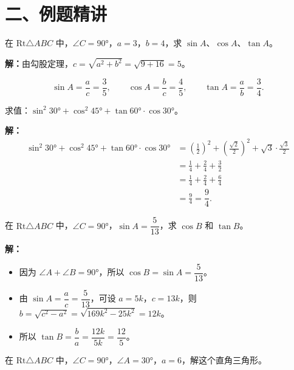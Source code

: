 \documentclass[12pt, a4paper]{ctexart}
\begin{document}
\section*{\textcolor{examorange}{二、例题精讲}}

\begin{examplebox}[【例题1】已知两边求三角函数]
在 $\text{Rt}\triangle ABC$ 中，$\angle C=90°$，$a=3$，$b=4$，求 $\sin A$、$\cos A$、$\tan A$。
\end{examplebox}

\textbf{解：}由勾股定理，$c=\sqrt{a^2+b^2}=\sqrt{9+16}=5$。

\[
\sin A=\frac{a}{c}=\frac{3}{5},\qquad
\cos A=\frac{b}{c}=\frac{4}{5},\qquad
\tan A=\frac{a}{b}=\frac{3}{4}.
\]

\begin{examplebox}[【例题2】特殊角的计算]
求值：$\sin^2 30°+\cos^2 45°+\tan 60°\cdot\cos 30°$。
\end{examplebox}

\textbf{解：}
\begin{align*}
\sin^2 30°+\cos^2 45°+\tan 60°\cdot\cos 30°
&=\left(\frac{1}{2}\right)^2+\left(\frac{\sqrt{2}}{2}\right)^2+\sqrt{3}\cdot\frac{\sqrt{3}}{2}\\
&=\frac{1}{4}+\frac{2}{4}+\frac{3}{2}\\
&=\frac{1}{4}+\frac{2}{4}+\frac{6}{4}\\
&=\frac{9}{4}=\boxed{\dfrac{9}{4}}.
\end{align*}

\begin{examplebox}[【例题3】互余关系的应用]
在 $\text{Rt}\triangle ABC$ 中，$\angle C=90°$，$\sin A=\dfrac{5}{13}$，求 $\cos B$ 和 $\tan B$。
\end{examplebox}

\textbf{解：}
\begin{itemize}[nosep]
  \item 因为 $\angle A+\angle B=90°$，所以 $\cos B=\sin A=\dfrac{5}{13}$。
  \item 由 $\sin A=\dfrac{a}{c}=\dfrac{5}{13}$，可设 $a=5k$，$c=13k$，则 $b=\sqrt{c^2-a^2}=\sqrt{169k^2-25k^2}=12k$。
  \item 所以 $\tan B=\dfrac{b}{a}=\dfrac{12k}{5k}=\boxed{\dfrac{12}{5}}$。
\end{itemize}

\begin{examplebox}[【例题4】解直角三角形]
在 $\text{Rt}\triangle ABC$ 中，$\angle C=90°$，$\angle A=30°$，$a=6$，解这个直角三角形。
\end{examplebox}
\end{document}
